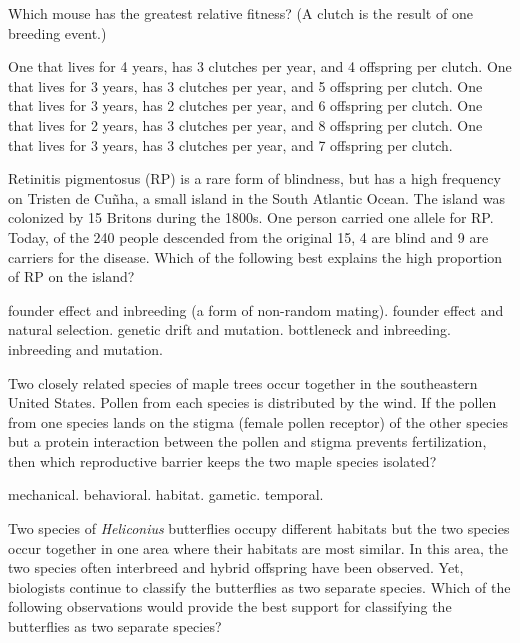\question
Which mouse has the greatest relative fitness? (A clutch is the result of one breeding event.)

\begin{choices}
\choice One that lives for 4 years, has 3 clutches per year, and 4 offspring per clutch.%
\choice One that lives for 3 years, has 3 clutches per year, and 5 offspring per clutch.%
\choice One that lives for 3 years, has 2 clutches per year, and 6 offspring per clutch. %
\choice One that lives for 2 years, has 3 clutches per year, and 8 offspring per clutch. %
\correctchoice One that lives for 3 years, has 3 clutches per year, and 7 offspring per clutch. %
\end{choices}


\question
Retinitis pigmentosus (RP) is a rare form of blindness, but has a high frequency on Tristen de Cu\~nha, a small island in the South Atlantic Ocean.  The island was colonized by 15 Britons during the 1800s.  One person carried one allele for RP.  Today, of the 240 people descended from the original 15, 4 are blind and 9 are carriers for the disease.  Which of the following best explains the high proportion of RP on the island?

\begin{choices}
\correctchoice founder effect and inbreeding (a form of non-random mating).%
\choice founder effect and natural selection.%
\choice genetic drift and mutation.%
\choice bottleneck and inbreeding.%
\choice inbreeding and mutation.%
\end{choices}


\question
Two closely related species of maple trees occur together in the southeastern United States.  Pollen from each species is distributed by the wind.  If the pollen from one species lands on the stigma (female pollen receptor) of the other species but a protein interaction between the pollen and stigma prevents fertilization, then which reproductive barrier keeps the two maple species isolated?

\begin{choices}
\choice mechanical.%
\choice behavioral.%
\choice habitat.%
\correctchoice gametic.%
\choice temporal.%
\end{choices}

\question
Two species of \textit{Heliconius} butterflies occupy different habitats but the two species occur together in one area where their habitats are most similar. In this area, the two species often interbreed and hybrid offspring have been observed.  Yet, biologists continue to classify the butterflies as two separate species.  Which of the following observations would provide the best support for classifying the butterflies as two separate species? 

